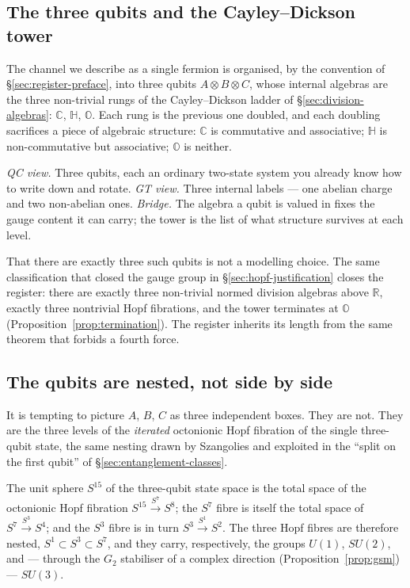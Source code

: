 \subsection{The three qubits and the Cayley--Dickson tower}

The channel we describe as a single fermion is organised, by the convention of
\S\ref{sec:register-preface}, into three qubits $A \otimes B \otimes C$, whose
internal algebras are the three non-trivial rungs of the Cayley--Dickson ladder of
\S\ref{sec:division-algebras}:
$\mathbb{C}$, $\mathbb{H}$, $\mathbb{O}$. Each rung is the previous one doubled, and each doubling
sacrifices a piece of algebraic structure: $\mathbb{C}$ is commutative and associative;
$\mathbb{H}$ is non-commutative but associative; $\mathbb{O}$ is neither.

\emph{QC view.} Three qubits, each an ordinary two-state system you already know how to write down
and rotate. \emph{GT view.} Three internal labels --- one abelian charge and two non-abelian ones.
\emph{Bridge.} The algebra a qubit is valued in fixes the gauge content it can carry; the tower is
the list of what structure survives at each level.

That there are exactly three such qubits is not a modelling choice. The same classification that
closed the gauge group in \S\ref{sec:hopf-justification} closes the register: there are exactly
three non-trivial normed division algebras above $\mathbb{R}$, exactly three nontrivial Hopf
fibrations, and the tower terminates at $\mathbb{O}$ (Proposition~\ref{prop:termination}). The
register inherits its length from the same theorem that forbids a fourth force.

\subsection{The qubits are nested, not side by side}

It is tempting to picture $A$, $B$, $C$ as three independent boxes. They are not. They are the
three levels of the \emph{iterated} octonionic Hopf fibration of the single three-qubit state, the
same nesting drawn by Szangolies \autocite{szangolies2025standardmodel} and exploited in the
``split on the first qubit'' of \S\ref{sec:entanglement-classes}.

\begin{proposition}\label{prop:iterated-hopf}
The unit sphere $S^{15}$ of the three-qubit state space is the total space of the octonionic Hopf
fibration $S^{15} \xrightarrow{S^7} S^8$; the $S^7$ fibre is itself the total space of
$S^7 \xrightarrow{S^3} S^4$; and the $S^3$ fibre is in turn $S^3 \xrightarrow{S^1} S^2$. The three
Hopf fibres are therefore nested, $S^1 \subset S^3 \subset S^7$, and they carry, respectively, the
groups $U(1)$, $SU(2)$, and --- through the $G_2$ stabiliser of a complex direction
(Proposition~\ref{prop:gsm}) --- $SU(3)$.
\end{proposition}

